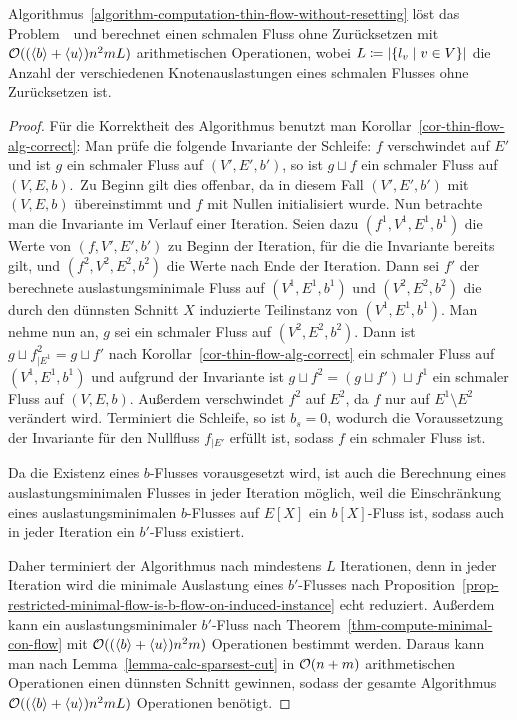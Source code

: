 \begin{theorem}
		Algorithmus~\ref{algorithm-computation-thin-flow-without-resetting} löst das Problem~\probTFwoR\ und berechnet einen schmalen Fluss ohne Zurücksetzen mit $\mathcal{O}((\langle b\rangle + \langle u\rangle) n^2 m L)$ arithmetischen Operationen, wobei $L\coloneq \lvert\{ l_v \mid v\in V \}\rvert$ die Anzahl der verschiedenen Knotenauslastungen eines schmalen Flusses ohne Zurücksetzen ist.
\end{theorem}
\begin{proof}
	Für die Korrektheit des Algorithmus benutzt man Korollar~\ref{cor-thin-flow-alg-correct}:
	Man prüfe die folgende Invariante der Schleife:
	\glqq $f$ verschwindet auf $E'$ und ist $g$ ein schmaler Fluss auf $(V',E',b')$, so ist $g \sqcup f$ ein schmaler Fluss auf $(V, E, b)$.\grqq\ 
	Zu Beginn gilt dies offenbar, da in diesem Fall $(V', E', b')$ mit $(V, E, b)$ übereinstimmt und $f$ mit Nullen initialisiert wurde.
	Nun betrachte man die Invariante im Verlauf einer Iteration.
	Seien dazu $(f^1, V^1, E^1, b^1)$ die Werte von $(f, V', E', b')$ zu Beginn der Iteration, für die die Invariante bereits gilt, und $(f^2, V^2, E^2, b^2)$ die Werte nach Ende der Iteration.
	Dann sei $f'$ der berechnete auslastungsminimale Fluss auf $(V^1, E^1, b^1)$ und $(V^2, E^2, b^2)$ die durch den dünnsten Schnitt $X$ induzierte Teilinstanz von $(V^1, E^1, b^1)$.
	Man nehme nun an, $g$ sei ein schmaler Fluss auf $(V^2, E^2, b^2)$.
	Dann ist $g\sqcup f^2_{\mid E^1} = g \sqcup f'$ nach Korollar~\ref{cor-thin-flow-alg-correct} ein schmaler Fluss auf $(V^1, E^1, b^1)$ und aufgrund der Invariante ist $g \sqcup f^2 = (g \sqcup f') \sqcup f^1$ ein schmaler Fluss auf $(V, E, b)$.
	Außerdem verschwindet $f^2$ auf $E^2$, da $f$ nur auf $E^1\setminus E^2$ verändert wird.
	Terminiert die Schleife, so ist $b_s=0$, wodurch die Voraussetzung der Invariante
	für den Nullfluss $f_{\mid E'}$ erfüllt ist, sodass $f$ ein schmaler Fluss ist.
	
	Da die Existenz eines $b$-Flusses vorausgesetzt wird, ist auch die Berechnung eines auslastungsminimalen Flusses in jeder Iteration möglich, weil die Einschränkung eines auslastungsminimalen $b$-Flusses auf $E[X]$ ein $b[X]$-Fluss ist, sodass auch in jeder Iteration ein $b'$-Fluss existiert.
	
	Daher terminiert der Algorithmus nach mindestens $L$ Iterationen, denn in jeder Iteration wird die minimale Auslastung eines $b'$-Flusses nach Proposition~\ref{prop-restricted-minimal-flow-is-b-flow-on-induced-instance} echt reduziert.
	Außerdem kann ein auslastungsminimaler $b'$-Fluss nach Theorem~\ref{thm-compute-minimal-con-flow} mit $\mathcal{O}((\langle b\rangle+\langle u\rangle) n^2 m)$ Operationen bestimmt werden.
	Daraus kann man nach Lemma~\ref{lemma-calc-sparsest-cut} in $\mathcal{O}(n+m)$ arithmetischen Operationen einen dünnsten Schnitt gewinnen, sodass der gesamte Algorithmus $\mathcal{O}((\langle b\rangle + \langle u\rangle) n^2 m L)$ Operationen benötigt.
\end{proof}

